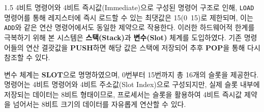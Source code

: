 \documentclass[a4paper, 12pt]{article}
\begin{document}
\begin{spacing}{1.5}
4비트 명령어와 4비트 즉시값(Immediate)으로 구성된 명령어 구조로 인해, 
\texttt{LOAD} 명령어를 통해 레지스터에 즉시 로드할 수 있는 최댓값은 15(0~15)로 제한되며, 
이는 \texttt{ADD}와 같은 연산 명령어에서도 동일한 제약으로 작용한다. 
이러한 하드웨어적 한계를 극복하기 위해 본 시스템은 \textbf{스택(Stack)}과 \textbf{변수(Slot)} 체계를 도입하였다. 
기존 명령어들의 연산 결괏값을 \textbf{PUSH}하면 해당 값은 스택에 저장되어 추후 \textbf{POP}을 통해 다시 참조할 수 있다.

변수 체계는 \textbf{SLOT}으로 명명하였으며, 0번부터 15번까지 총 16개의 슬롯을 제공한다. 
명령어는 4비트 명령어와 4비트 주소값(Slot Index)으로 구성되지만, 
실제 슬롯 내부에 저장되는 데이터는 8비트 형태이므로, 
프로세서는 슬롯을 활용하여 4비트 즉시값 제약을 넘어서는 8비트 크기의 데이터를 자유롭게 연산할 수 있다.

\end{spacing}
\end{document}
